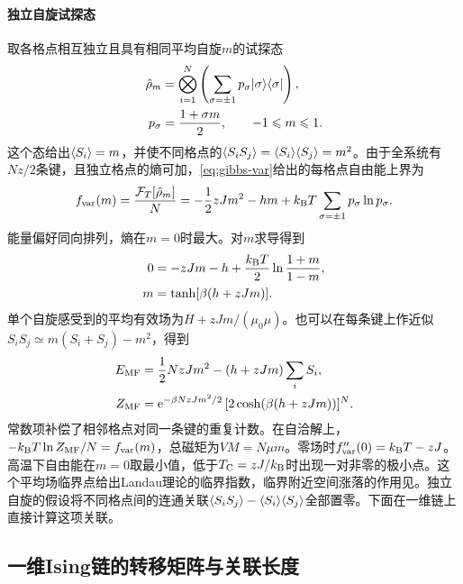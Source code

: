 \paragraph{独立自旋试探态}

取各格点相互独立且具有相同平均自旋$m$的试探态
\begin{align*}
	\hat\rho_m &= \bigotimes_{i=1}^N\left(\sum_{\sigma=\pm1}p_\sigma\lvert\sigma\rangle\langle\sigma\rvert\right),\\
	p_\sigma &= \frac{1 + \sigma m}{2},\qquad -1 \leqslant m \leqslant 1 .
\end{align*}
这个态给出$\langle S_i\rangle = m$，并使不同格点的$\langle S_iS_j\rangle = \langle S_i\rangle\langle S_j\rangle = m^2$。由于全系统有$Nz/2$条键，且独立格点的熵可加，\eqref{eq:gibbs-var}给出的每格点自由能上界为
\begin{equation}
	\label{eq:sm-ising-variational-free-energy}
	f_{\mathrm{var}}(m) = \frac{\mathcal F_T[\hat\rho_m]}N
	= -\frac12 zJm^2 - hm + k_{\mathrm{B}} T\sum_{\sigma=\pm1}p_\sigma\ln p_\sigma .
\end{equation}
能量偏好同向排列，熵在$m = 0$时最大。对$m$求导得到
\begin{align}
	0 &= -zJm - h + \frac{k_{\mathrm{B}} T}{2}\ln\frac{1 + m}{1 - m},\notag\\
	m &= \tanh[\beta(h + zJm)] .
	\label{eq:ising-mf-spin}
\end{align}
单个自旋感受到的平均有效场为$H + zJm/(\mu_0\mu)$。也可以在每条键上作近似$S_iS_j \simeq m(S_i + S_j) - m^2$，得到
\begin{align*}
	E_{\mathrm{MF}} &= \frac12NzJm^2 - (h + zJm)\sum_iS_i,\\
	Z_{\mathrm{MF}} &= \mathop{}\!\mathrm{e}^{-\beta NzJm^2/2}\,[2\cosh(\beta(h + zJm))]^N .
\end{align*}
常数项补偿了相邻格点对同一条键的重复计数。在自洽解上，$-k_{\mathrm{B}} T\ln Z_{\mathrm{MF}}/N = f_{\mathrm{var}}(m)$，总磁矩为$VM = N\mu m$。零场时$f_{\mathrm{var}}''(0) = k_{\mathrm{B}} T - zJ$。高温下自由能在$m = 0$取最小值，低于$T_\mathrm C = zJ/k_{\mathrm{B}}$时出现一对非零的极小点。这个平均场临界点给出Landau理论的临界指数，临界附近空间涨落的作用见。独立自旋的假设将不同格点间的连通关联$\langle S_iS_j\rangle - \langle S_i\rangle\langle S_j\rangle$全部置零。下面在一维链上直接计算这项关联。

\subsection{一维Ising链的转移矩阵与关联长度}
\label{sec:ising-chain}


